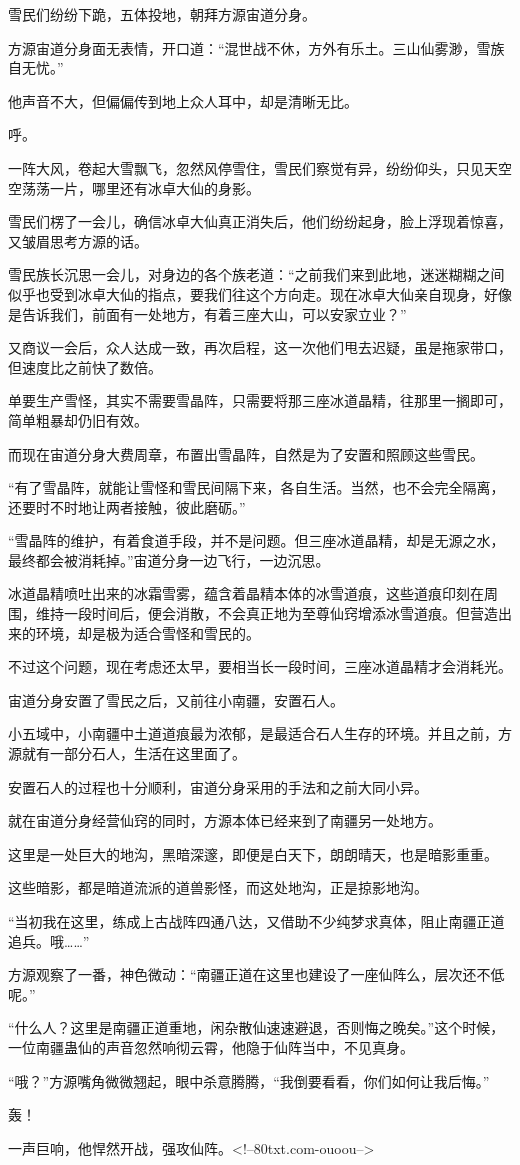 \begin{this_body}
雪民们纷纷下跪，五体投地，朝拜方源宙道分身。

方源宙道分身面无表情，开口道：“混世战不休，方外有乐土。三山仙雾渺，雪族自无忧。”

他声音不大，但偏偏传到地上众人耳中，却是清晰无比。

呼。

一阵大风，卷起大雪飘飞，忽然风停雪住，雪民们察觉有异，纷纷仰头，只见天空空荡荡一片，哪里还有冰卓大仙的身影。

雪民们楞了一会儿，确信冰卓大仙真正消失后，他们纷纷起身，脸上浮现着惊喜，又皱眉思考方源的话。

雪民族长沉思一会儿，对身边的各个族老道：“之前我们来到此地，迷迷糊糊之间似乎也受到冰卓大仙的指点，要我们往这个方向走。现在冰卓大仙亲自现身，好像是告诉我们，前面有一处地方，有着三座大山，可以安家立业？”

又商议一会后，众人达成一致，再次启程，这一次他们甩去迟疑，虽是拖家带口，但速度比之前快了数倍。

单要生产雪怪，其实不需要雪晶阵，只需要将那三座冰道晶精，往那里一搁即可，简单粗暴却仍旧有效。

而现在宙道分身大费周章，布置出雪晶阵，自然是为了安置和照顾这些雪民。

“有了雪晶阵，就能让雪怪和雪民间隔下来，各自生活。当然，也不会完全隔离，还要时不时地让两者接触，彼此磨砺。”

“雪晶阵的维护，有着食道手段，并不是问题。但三座冰道晶精，却是无源之水，最终都会被消耗掉。”宙道分身一边飞行，一边沉思。

冰道晶精喷吐出来的冰霜雪雾，蕴含着晶精本体的冰雪道痕，这些道痕印刻在周围，维持一段时间后，便会消散，不会真正地为至尊仙窍增添冰雪道痕。但营造出来的环境，却是极为适合雪怪和雪民的。

不过这个问题，现在考虑还太早，要相当长一段时间，三座冰道晶精才会消耗光。

宙道分身安置了雪民之后，又前往小南疆，安置石人。

小五域中，小南疆中土道道痕最为浓郁，是最适合石人生存的环境。并且之前，方源就有一部分石人，生活在这里面了。

安置石人的过程也十分顺利，宙道分身采用的手法和之前大同小异。

就在宙道分身经营仙窍的同时，方源本体已经来到了南疆另一处地方。

这里是一处巨大的地沟，黑暗深邃，即便是白天下，朗朗晴天，也是暗影重重。

这些暗影，都是暗道流派的道兽影怪，而这处地沟，正是掠影地沟。

“当初我在这里，练成上古战阵四通八达，又借助不少纯梦求真体，阻止南疆正道追兵。哦……”

方源观察了一番，神色微动：“南疆正道在这里也建设了一座仙阵么，层次还不低呢。”

“什么人？这里是南疆正道重地，闲杂散仙速速避退，否则悔之晚矣。”这个时候，一位南疆蛊仙的声音忽然响彻云霄，他隐于仙阵当中，不见真身。

“哦？”方源嘴角微微翘起，眼中杀意腾腾，“我倒要看看，你们如何让我后悔。”

轰！

一声巨响，他悍然开战，强攻仙阵。<!--80txt.com-ouoou-->

\end{this_body}


